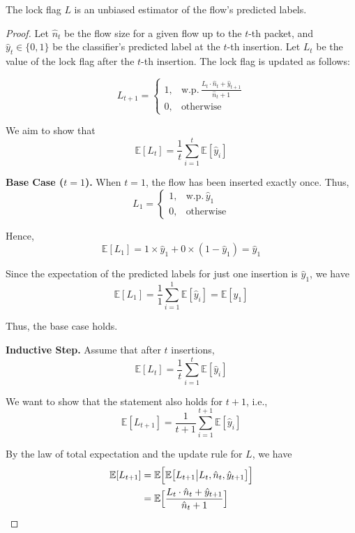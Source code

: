 \begin{theorem}
\label{theorem:flag}
The lock flag \(L\) is an unbiased estimator of the flow’s predicted labels.
\end{theorem}


\begin{proof}
Let \(\hat{n}_t\) be the flow size for a given flow up to the \(t\)-th packet, and \(\hat{y}_t\in\{0,1\}\) be the classifier’s predicted label at the \(t\)-th insertion. Let \(L_t\) be the value of the lock flag after the \(t\)-th insertion. The lock flag is updated as follows:

\[
L_{t+1} = \begin{cases}
    1, & \text{w.p.}\, \frac{L_t \cdot \hat{n}_{t} + \hat{y}_{t+1}}{\hat{n}_t + 1} \\
    0, & \text{otherwise}
\end{cases}
\]

We aim to show that
\[
    \mathbb{E}[L_t] = \frac{1}{t} \sum_{i=1}^t \mathbb{E}[\hat{y}_i]
\]


\textbf{Base Case (\(t=1\)).}
When \(t=1\), the flow has been inserted exactly once. Thus,
\[
L_1 = \begin{cases}
    1, & \text{w.p.}\, \hat{y}_1 \\
    0, & \text{otherwise}
\end{cases}
\]

Hence,
\[
\mathbb{E}[L_1] = 1 \times \hat{y}_1 + 0 \times (1 - \hat{y}_1) = \hat{y}_1
\]

Since the expectation of the predicted labels for just one insertion is \(\hat{y}_1\), we have
\[
    \mathbb{E}[L_1] = \frac{1}{1}\sum_{i=1}^1 \mathbb{E}[\hat{y}_i] = \mathbb{E}[\hat{y}_1]
\]

Thus, the base case holds.


\textbf{Inductive Step.}
Assume that after \(t\) insertions,
\[
\mathbb{E}[L_t] = \frac{1}{t}\sum_{i=1}^t \mathbb{E}[\hat{y}_i]
\]

We want to show that the statement also holds for \(t+1\), i.e.,
\[
\mathbb{E}[L_{t+1}] = \frac{1}{t+1}\sum_{i=1}^{t+1} \mathbb{E}[\hat{y}_i]
\]

By the law of total expectation and the update rule for \(L\), we have
\begin{align*}
\mathbb{E}[L_{t+1}]
    &= \mathbb{E} \Bigl[\mathbb{E}\bigl[L_{t+1} \big\vert L_t, \hat{n}_t, \hat{y}_{t+1} \bigr]\Bigr] \\
    &= \mathbb{E} \Bigl[\frac{L_t \cdot \hat{n}_t + \hat{y}_{t+1}}{\hat{n}_t + 1}\Bigr]
\end{align*}


\end{proof}
